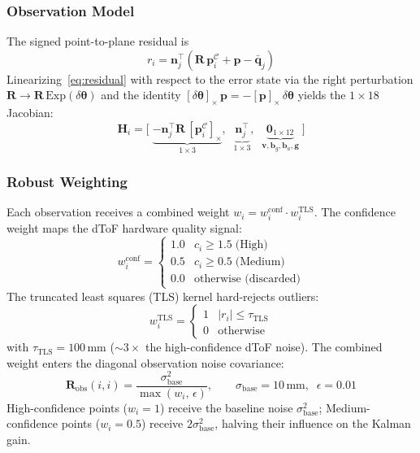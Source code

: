 \subsubsection{Observation Model}
\label{sec:obs_model}

The signed point-to-plane residual is
\begin{equation}
    r_i = \mathbf{n}_j^\top\!\left(\mathbf{R}\,\mathbf{p}_i^{\mathcal{C}} + \mathbf{p} - \bar{\mathbf{q}}_j\right)
    \label{eq:residual}
\end{equation}
Linearizing~\eqref{eq:residual} with respect to the error state via the right perturbation $\mathbf{R} \to \mathbf{R}\,\mathrm{Exp}(\delta\boldsymbol{\theta})$ and the identity $[\delta\boldsymbol{\theta}]_\times\,\mathbf{p} = -[\mathbf{p}]_\times\,\delta\boldsymbol{\theta}$ yields the $1 \times 18$ Jacobian:
\begin{equation}
    \mathbf{H}_i = \bigl[\;
        \underbrace{-\mathbf{n}_j^\top\mathbf{R}\,[\mathbf{p}_i^{\mathcal{C}}]_\times}_{1 \times 3},\;\;
        \underbrace{\mathbf{n}_j^\top}_{1 \times 3},\;\;
        \underbrace{\mathbf{0}_{1 \times 12}}_{\mathbf{v},\mathbf{b}_g,\mathbf{b}_a,\mathbf{g}}
    \;\bigr]
    \label{eq:jacobian}
\end{equation}

\subsubsection{Robust Weighting}
\label{sec:robust}

Each observation receives a combined weight $w_i = w_i^\text{conf} \cdot w_i^\text{TLS}$.
The confidence weight maps the dToF hardware quality signal:
\begin{equation}
    w_i^\text{conf} = \begin{cases}
        1.0 & c_i \geq 1.5 \;\text{(High)} \\
        0.5 & c_i \geq 0.5 \;\text{(Medium)} \\
        0.0 & \text{otherwise (discarded)}
    \end{cases}
    \label{eq:conf_weight}
\end{equation}
The truncated least squares (TLS) kernel hard-rejects outliers:
\begin{equation}
    w_i^\text{TLS} = \begin{cases}
        1 & |r_i| \leq \tau_\text{TLS} \\
        0 & \text{otherwise}
    \end{cases}
    \label{eq:tls}
\end{equation}
with $\tau_\text{TLS} = 100$\,mm (${\sim}3\times$ the high-confidence dToF noise).
The combined weight enters the diagonal observation noise covariance:
\begin{equation}
    \mathbf{R}_\text{obs}(i,i) = \frac{\sigma_\text{base}^2}{\max(w_i,\,\epsilon)}, \qquad
    \sigma_\text{base} = 10\,\text{mm},\;\; \epsilon = 0.01
    \label{eq:Robs}
\end{equation}
High-confidence points ($w_i = 1$) receive the baseline noise $\sigma_\text{base}^2$; Medium-confidence points ($w_i = 0.5$) receive $2\sigma_\text{base}^2$, halving their influence on the Kalman gain.

